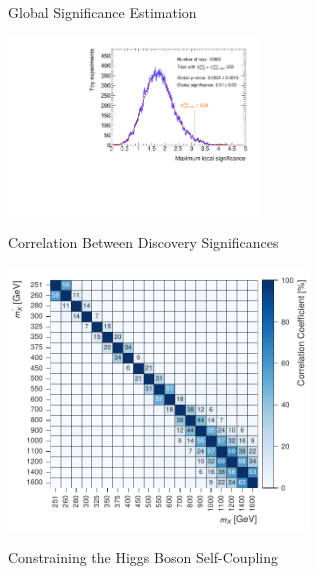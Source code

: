 \documentclass[11pt, xcolor={dvipsnames}, aspectratio=169]{beamer}
\begin{document}

\begin{frame}{Global Significance Estimation}
  \centering

  \includegraphics[width=0.5\textwidth]{global_significance/zmax_toys}
\end{frame}


\begin{frame}{Correlation Between Discovery Significances}
  \centering

  \includegraphics[width=0.6\textwidth]{global_significance/sig_corr}

\end{frame}


\begin{frame}[standout]
  Constraining the Higgs Boson Self-Coupling
\end{frame}

\end{document}
